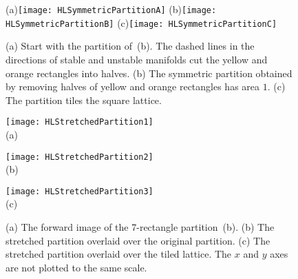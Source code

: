 \begin{description}
\begin{figure}
  \centering
(a)\texttt{[image: HLSymmetricPartitionA]}
(b)\texttt{[image: HLSymmetricPartitionB]}
(c)\texttt{[image: HLSymmetricPartitionC]}
  \caption{\label{fig:HLSymmetricPartition}
(a)
Start with the partition of \,(b).
The dashed lines in the directions of stable and unstable manifolds cut
the yellow and orange rectangles into halves.
(b)
The symmetric partition obtained by removing halves of yellow and orange
rectangles has area $1$.
(c)
The partition tiles the square lattice.
}
\end{figure}

%

\begin{figure}
  \centering
\begin{minipage}[b]{0.22\textwidth}  \centering
    \texttt{[image: HLStretchedPartition1]}\\(a)
\end{minipage}
\begin{minipage}[b]{0.30\textwidth}  \centering
    \texttt{[image: HLStretchedPartition2]}\\(b)
\end{minipage}
\begin{minipage}[b]{0.40\textwidth}  \centering
    \texttt{[image: HLStretchedPartition3]}\\(c)
\end{minipage}
 	\caption{\label{fig:HLStretchedPartition}
(a) The forward image of the 7-rectangle partition
    \,(b).
(b) The stretched partition overlaid over the original partition.
(c) The stretched partition overlaid over the tiled lattice.
The $x$ and $y$ axes are not plotted to the same scale.
}
\end{figure}


\end{description}
